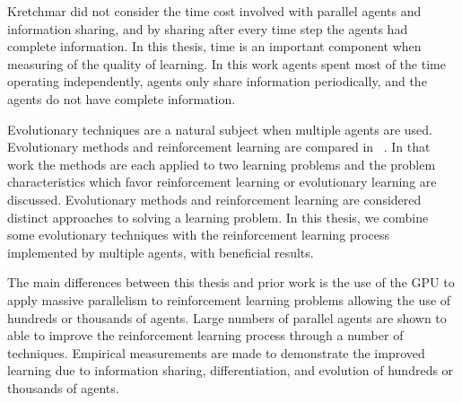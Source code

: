 Kretchmar did not consider the time cost involved with parallel agents and information sharing, and by sharing after every time step the agents had complete information.  In this thesis, time is an important component when measuring of the quality of learning. In this work agents spent most of the time operating independently, agents only share information periodically, and the agents do not have complete information. 

Evolutionary techniques are a natural subject when multiple agents are used.  Evolutionary methods and reinforcement learning are compared in ~\cite{Whiteson:2010p4931}.  In that work the methods are each applied to two learning problems and the problem characteristics which favor reinforcement learning or evolutionary learning are discussed.  Evolutionary methods and reinforcement learning are considered distinct approaches to solving a learning problem.  In this thesis, we combine some evolutionary techniques with the reinforcement learning process implemented by multiple agents, with beneficial results.

The main differences between this thesis and prior work is the use of the GPU to apply massive parallelism to reinforcement learning problems allowing the use of hundreds or thousands of agents. Large numbers of parallel agents are shown to able to improve the reinforcement learning process through a number of techniques.  Empirical measurements are made to demonstrate the improved learning due to information sharing, differentiation, and evolution of hundreds or thousands of agents.
